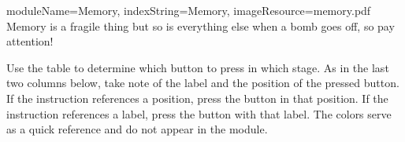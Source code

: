 \documentclass{../../ktane-mod}
\begin{document}
\begin{module}{
  moduleName=Memory,
  indexString=Memory,
  imageResource=memory.pdf
}
{
  Memory is a fragile thing but so is everything else when a bomb goes off, so pay attention!
}
  \begin{bulletlist}
  \end{bulletlist}

  Use the table to determine which button to press in which stage.
  As in the last two columns below, take note of the label and the position of the pressed button.
  If the instruction references a position, press the button in that position.
  If the instruction references a label, press the button with that label.
  The colors serve as a quick reference and do not appear in the module.


\end{module}
\end{document}
